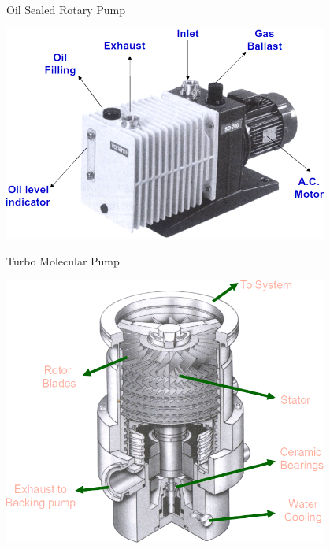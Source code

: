 \documentclass[11]{beamer}
\begin{document}
\begin{frame}{Oil Sealed Rotary Pump}
\begin{center}
\includegraphics[width=0.8\textwidth]{rotaryPumpMarked.png}
\end{center}
\end{frame}




\begin{frame}{Turbo Molecular Pump}
\begin{center}
\includegraphics[width=0.8\textwidth]{TurboPump_marked.png}
\end{center}
\end{frame}
\end{document}
